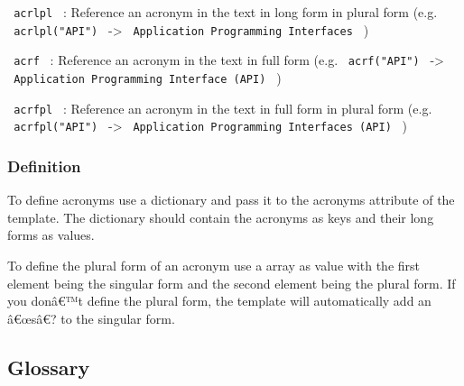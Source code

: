 \texttt{\ acrlpl\ } : Reference an acronym in the text in long form in
plural form (e.g. \texttt{\ acrlpl("API")\ } -\textgreater{}
\texttt{\ Application\ Programming\ Interfaces\ } )

\texttt{\ acrf\ } : Reference an acronym in the text in full form (e.g.
\texttt{\ acrf("API")\ } -\textgreater{}
\texttt{\ Application\ Programming\ Interface\ (API)\ } )

\texttt{\ acrfpl\ } : Reference an acronym in the text in full form in
plural form (e.g. \texttt{\ acrfpl("API")\ } -\textgreater{}
\texttt{\ Application\ Programming\ Interfaces\ (API)\ } )

\subsubsection{Definition}\label{definition}

To define acronyms use a dictionary and pass it to the acronyms
attribute of the template. The dictionary should contain the acronyms as
keys and their long forms as values.

\begin{Shaded}
\begin{Highlighting}[]
\NormalTok{)}
\end{Highlighting}
\end{Shaded}

To define the plural form of an acronym use a array as value with the
first element being the singular form and the second element being the
plural form. If you donâ€™t define the plural form, the template will
automatically add an â€œsâ€? to the singular form.

\begin{Shaded}
\begin{Highlighting}[]
\NormalTok{)}
\end{Highlighting}
\end{Shaded}

\subsection{Glossary}\label{glossary}

